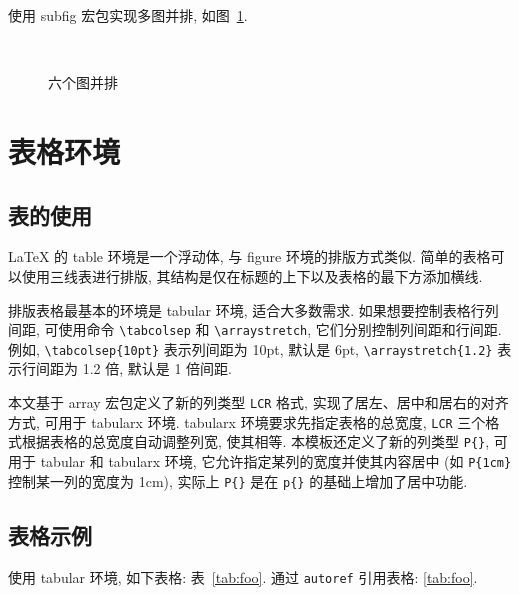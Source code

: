\documentclass[12pt,final]{article}
\numberwithin{equation}{section}
\numberwithin{figure}{section}
\numberwithin{table}{section}
\theoremstyle{plain}
\begin{document}
使用 subfig 宏包实现多图并排, 如图~\ref{fig:images}.

\begin{figure}[htp!]
\centering
{}
\hfill
{}
\hfill
{} \\
\hfill
{}
\hfill
{}
\caption{六个图并排}
\label{fig:images}
\end{figure}



\clearpage
\section{表格环境}

\subsection{表的使用}

LaTeX 的 table 环境是一个浮动体, 与 figure 环境的排版方式类似. 简单的表格可以使用三线表进行排版, 其结构是仅在标题的上下以及表格的最下方添加横线.

排版表格最基本的环境是 tabular 环境, 适合大多数需求. 如果想要控制表格行列间距, 可使用命令 \verb|\tabcolsep| 和 \verb|\arraystretch|, 它们分别控制列间距和行间距. 例如, \verb|\tabcolsep{10pt}| 表示列间距为 10pt, 默认是 6pt,  \verb|\arraystretch{1.2}| 表示行间距为 1.2 倍, 默认是 1 倍间距.

本文基于 array 宏包定义了新的列类型 \verb|LCR| 格式, 实现了居左、居中和居右的对齐方式, 可用于 tabularx 环境. tabularx 环境要求先指定表格的总宽度, \verb|LCR| 三个格式根据表格的总宽度自动调整列宽, 使其相等. 本模板还定义了新的列类型 \verb|P{}|, 可用于 tabular 和 tabularx 环境, 它允许指定某列的宽度并使其内容居中 (如 \verb|P{1cm}| 控制某一列的宽度为 1cm), 实际上 \verb|P{}| 是在 \verb|p{}| 的基础上增加了居中功能.

\subsection{表格示例}

使用 tabular 环境, 如下表格: 表~\ref{tab:foo}. 通过 \verb|autoref| 引用表格: \autoref{tab:foo}.
\end{document}
